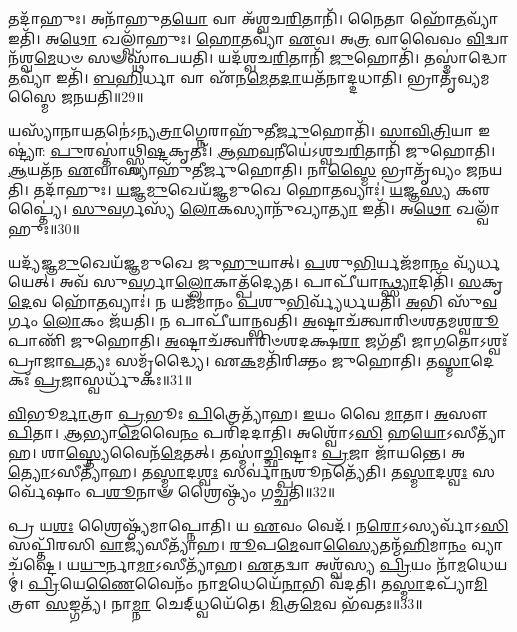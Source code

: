 𑌤𑌦𑌾᳴𑌹𑍁𑌃।
𑌅𑌨𑌾᳴𑌹𑍁𑌤\-\ul{𑌯𑍋} 𑌵𑌾 𑌅᳴𑌶𑍍𑌵𑌚\-\ul{𑌰𑌿}\-𑌤𑌾𑌨𑌿᳴।
𑌨𑍈𑌤𑌾 𑌹𑍋᳴\-\ul{𑌤}\-𑌵𑍍𑌯𑌾᳴ 𑌇𑌤𑌿᳴।
𑌅\-\ul{𑌥𑍋} 𑌖𑌲𑍍𑌵𑌾᳴𑌹𑍁𑌃।
\-\ul{𑌹𑍋}\-\-\ul{𑌤}\-𑌵𑍍𑌯𑌾᳴ \ul{𑌏}\-𑌵।
𑌅\-\ul{𑌤𑍍𑌰} 𑌵𑌾𑌵𑍈𑌵𑌂 \ul{𑌵𑌿}\-𑌦𑍍𑌵𑌾𑌨᳴𑌶𑍍𑌵\-\ul{𑌮𑍇}\-𑌧𑍞 𑌸𑍟𑌸𑍍𑌥𑌾᳴𑌪𑌯𑌤𑌿।
𑌯𑌦᳴𑌶𑍍𑌵𑌚\-\ul{𑌰𑌿}\-𑌤𑌾𑌨𑌿᳴ \ul{𑌜𑍁}\-𑌹𑍋𑌤𑌿᳴।
𑌤𑌸𑍍𑌮𑌾॑𑌦𑍍𑌧𑍋\-\ul{𑌤}\-𑌵𑍍𑌯𑌾᳴ 𑌇𑌤𑌿᳴।
\-\ul{𑌬}\-\-\ul{𑌹𑌿}\-𑌰𑍍𑌧𑌾 𑌵𑌾 𑌏᳴𑌨\-\ul{𑌮𑍇}\-𑌤\-\ul{𑌦𑌾}\-𑌯𑌤᳴𑌨𑌾𑌦𑍍𑌦𑌧𑌾𑌤𑌿।
𑌭𑍍𑌰𑌾𑌤𑍃᳴𑌵𑍍𑌯𑌮𑌸𑍍𑌮𑍈 𑌜𑌨𑌯𑌤𑌿॥29॥

𑌯𑌸𑍍𑌯𑌾᳴𑌨𑌾𑌯\-\ul{𑌤}\-𑌨𑍇॑\-𑌽𑌨𑍍𑌯\-\ul{𑌤𑍍𑌰𑌾}\-𑌗𑍍𑌨𑍇𑌰𑌾𑌹𑍁᳴𑌤𑍀\-\ul{𑌰𑍍𑌜𑍁}\-𑌹𑍋𑌤𑌿᳴।
\-\ul{𑌸𑌾}\-\-\ul{𑌵𑌿}\-\-\ul{𑌤𑍍𑌰𑌿}\-𑌯𑌾 𑌇𑌷𑍍𑌟𑍍𑌯𑌾॑: \ul{𑌪𑍁}\-𑌰𑌸𑍍𑌤𑌾॑𑌥𑍍𑌸𑍍𑌵𑌿\-\ul{𑌷𑍍𑌟}\-𑌕𑍃𑌤𑌃᳴।
\-\ul{𑌆}\-\-\ul{𑌹}\-\-\ul{𑌵}\-𑌨𑍀𑌯𑍇॑\-𑌽𑌶𑍍𑌵𑌚\-\ul{𑌰𑌿}\-𑌤𑌾𑌨𑌿᳴ 𑌜𑍁𑌹𑍋𑌤𑌿।
\-\ul{𑌆}\-𑌯𑌤᳴𑌨 \ul{𑌏}\-𑌵𑌾𑌸𑍍𑌯𑌾𑌹𑍁᳴𑌤𑍀𑌰𑍍𑌜𑍁𑌹𑍋𑌤𑌿।
𑌨𑌾\-\ul{𑌸𑍍𑌮𑍈} 𑌭𑍍𑌰𑌾𑌤𑍃᳴𑌵𑍍𑌯𑌂 𑌜𑌨𑌯𑌤𑌿।
𑌤𑌦𑌾᳴𑌹𑍁𑌃।
\-\ul{𑌯}\-\-\ul{𑌜𑍍𑌞}\-\-\ul{𑌮𑍁}\-𑌖𑍇𑌯᳴𑌜𑍍𑌞𑌮𑍁𑌖𑍇 𑌹𑍋\-\ul{𑌤}\-𑌵𑍍𑌯𑌾𑌃॑।
\-\ul{𑌯}\-𑌜𑍍𑌞\-\ul{𑌸𑍍𑌯} 𑌕𑍢𑌪𑍍𑌤𑍍𑌯𑍈॑।
\-\ul{𑌸𑍁}\-\-\ul{𑌵}\-𑌰𑍍𑌗𑌸𑍍𑌯᳴ \ul{𑌲𑍋}\-𑌕𑌸𑍍𑌯𑌾𑌨𑍁᳴𑌖𑍍𑌯𑌾\-\ul{𑌤𑍍𑌯𑌾} 𑌇𑌤𑌿᳴।
𑌅\-\ul{𑌥𑍋} 𑌖𑌲𑍍𑌵𑌾᳴𑌹𑍁𑌃॥30॥

𑌯𑌦𑍍𑌯᳴𑌜𑍍𑌞\-\ul{𑌮𑍁}\-𑌖𑍇𑌯᳴𑌜𑍍𑌞𑌮𑍁𑌖𑍇 𑌜𑍁\-\ul{𑌹𑍁}\-𑌯𑌾𑌤𑍍।
\-\ul{𑌪}\-𑌶𑍁\-\ul{𑌭𑌿}\-𑌰𑍍𑌯𑌜᳴𑌮𑌾\-\ul{𑌨𑌂} 𑌵𑍍𑌯᳴𑌰𑍍𑌧𑌯𑍇𑌤𑍍।
𑌅𑌵᳴ 𑌸𑍁\-\ul{𑌵}\-𑌰𑍍𑌗𑌾\-\ul{𑌲𑍍𑌲𑍋}\-𑌕𑌾𑌤𑍍𑌪᳴𑌦𑍍𑌯𑍇𑌤।
𑌪𑌾𑌪𑍀᳴𑌯𑌾\-\ul{𑌨𑍍𑌥𑍍𑌸𑍍𑌯𑌾}\-𑌦𑌿𑌤𑌿᳴।
\-\ul{𑌸}\-𑌕𑍃\-\ul{𑌦𑍇}\-𑌵 𑌹𑍋᳴\-\ul{𑌤}\-𑌵𑍍𑌯𑌾𑌃॑।
𑌨 𑌯𑌜᳴𑌮𑌾𑌨𑌂 \ul{𑌪}\-𑌶𑍁\-\ul{𑌭𑌿}\-𑌰𑍍𑌵𑍍𑌯᳴𑌰𑍍𑌧𑌯𑌤𑌿।
\-\ul{𑌅}\-𑌭𑌿 𑌸𑍁᳴\-\ul{𑌵}\-𑌰𑍍𑌗𑌂 \ul{𑌲𑍋}\-𑌕𑌂 𑌜᳴𑌯𑌤𑌿।
𑌨 𑌪𑌾𑌪𑍀᳴𑌯𑌾𑌨𑍍𑌭𑌵𑌤𑌿।
\-\ul{𑌅}\-𑌷𑍍𑌟𑌾𑌚᳴𑌤𑍍𑌵𑌾𑌰𑌿𑍞𑌶𑌤𑌮𑌶𑍍𑌵\-\ul{𑌰𑍂}\-𑌪𑌾𑌣𑌿᳴ 𑌜𑍁𑌹𑍋𑌤𑌿।
\-\ul{𑌅}\-𑌷𑍍𑌟𑌾𑌚᳴𑌤𑍍𑌵𑌾𑌰𑌿𑍞𑌶𑌦𑌕𑍍𑌷\-\ul{𑌰𑌾} 𑌜𑌗᳴𑌤𑍀।
𑌜𑌾\-\ul{𑌗}\-𑌤𑍋\-𑌽𑌶𑍍𑌵𑌃᳴ 𑌪𑍍𑌰𑌾𑌜𑌾\-\ul{𑌪}\-𑌤𑍍𑌯𑌃 𑌸𑌮𑍃᳴𑌦𑍍𑌧𑍍𑌯𑍈।
𑌏\-\ul{𑌕}\-𑌮𑌤𑌿᳴𑌰𑌿𑌕𑍍𑌤𑌂 𑌜𑍁𑌹𑍋𑌤𑌿।
𑌤\-\ul{𑌸𑍍𑌮𑌾}\-𑌦𑍇𑌕𑌃᳴ \ul{𑌪𑍍𑌰}\-𑌜𑌾𑌸𑍍𑌵𑌰𑍍𑌧𑍁᳴𑌕𑌃॥31॥\anuvakamend[\-\ul{𑌅}\-\-\ul{𑌰𑍍𑌧}\-\-\ul{𑌯}\-\-\ul{𑌤𑌿} \ul{𑌜}\-\-\ul{𑌨}\-\-\ul{𑌯}\-\-\ul{𑌤𑌿} 𑌖𑌲𑍍𑌵𑌾᳴\-\ul{𑌹𑍁}\-𑌰𑍍𑌜𑌗᳴\-\ul{𑌤𑍀} 𑌤𑍍𑌰𑍀𑌣𑌿᳴ 𑌚]

\-\ul{𑌵𑌿}\-𑌭𑍂\-\ul{𑌰𑍍𑌮𑌾}\-𑌤𑍍𑌰𑌾 \ul{𑌪𑍍𑌰}\-𑌭𑍂𑌃 \ul{𑌪𑌿}\-𑌤𑍍𑌰𑍇𑌤𑍍𑌯𑌾᳴𑌹।
\-\ul{𑌇}\-𑌯𑌂 𑌵𑍈 \ul{𑌮𑌾}\-𑌤𑌾।
\-\ul{𑌅}\-𑌸𑍗 \ul{𑌪𑌿}\-𑌤𑌾।
\-\ul{𑌆}\-𑌭𑍍𑌯𑌾\-\ul{𑌮𑍇}\-𑌵𑍈\-\ul{𑌨𑌂} 𑌪𑌰𑌿᳴𑌦𑌦𑌾𑌤𑌿।
𑌅𑌶𑍍𑌵𑍋᳴𑌽\-\ul{𑌸𑌿} 𑌹\-\ul{𑌯𑍋}\-\-𑌽𑌸𑍀𑌤𑍍𑌯𑌾᳴𑌹।
𑌶𑌾\-\ul{𑌸𑍍𑌤𑍍𑌯𑍇}\-𑌵𑍈𑌨᳴\-\ul{𑌮𑍇}\-𑌤𑌤𑍍।
𑌤𑌸𑍍𑌮𑌾॑\-\ul{𑌚𑍍𑌛𑌿}\-𑌷𑍍𑌟𑌾𑌃 \ul{𑌪𑍍𑌰}\-𑌜𑌾 𑌜𑌾᳴𑌯𑌨𑍍𑌤𑍇।
𑌅\-\ul{𑌤𑍍𑌯𑍋}\-\-𑌽𑌸𑍀𑌤𑍍𑌯𑌾᳴𑌹।
𑌤\-\ul{𑌸𑍍𑌮𑌾}\-𑌦\-\ul{𑌶𑍍𑌵𑌃} 𑌸𑌰𑍍𑌵𑌾॑\-\ul{𑌨𑍍𑌪}\-𑌶𑍂𑌨𑌤𑍍𑌯𑍇᳴𑌤𑌿।
𑌤\-\ul{𑌸𑍍𑌮𑌾}\-𑌦\-\ul{𑌶𑍍𑌵𑌃} 𑌸𑌰𑍍𑌵𑍇᳴𑌷𑌾𑌂 𑌪\-\ul{𑌶𑍂}\-𑌨𑌾𑍟 𑌶𑍍𑌰𑍈𑌷𑍍𑌠𑍍𑌯𑌂᳴ 𑌗𑌚𑍍𑌛𑌤𑌿॥32॥

𑌪𑍍𑌰 𑌯\-\ul{𑌶𑌃} 𑌶𑍍𑌰𑍈𑌷𑍍𑌠𑍍𑌯᳴𑌮𑌾𑌪𑍍𑌨𑍋𑌤𑌿।
𑌯 \ul{𑌏}\-𑌵𑌂 𑌵𑍇𑌦᳴।
𑌨\-\ul{𑌰𑍋}\-𑌽𑌸𑍍𑌯𑌰𑍍𑌵𑌾᳴𑌽\-\ul{𑌸𑌿} 𑌸𑌪𑍍𑌤𑌿᳴𑌰𑌸𑌿 \ul{𑌵𑌾}\-𑌜𑍍𑌯᳴𑌸𑍀𑌤𑍍𑌯𑌾᳴𑌹।
\-\ul{𑌰𑍂}\-𑌪\-\ul{𑌮𑍇}\-𑌵𑌾\-\ul{𑌸𑍍𑌯𑍈}\-𑌤𑌨𑍍𑌮᳴\-\ul{𑌹𑌿}\-𑌮𑌾\-\ul{𑌨𑌂} 𑌵𑍍𑌯𑌾𑌚᳴𑌷𑍍𑌟𑍇।
𑌯\-\ul{𑌯𑍁}\-𑌰𑍍𑌨𑌾\-\ul{𑌮𑌾}\-\-𑌽𑌸𑍀𑌤𑍍𑌯𑌾᳴𑌹।
\-\ul{𑌏}\-𑌤𑌦𑍍𑌵𑌾 𑌅𑌶𑍍𑌵᳴𑌸𑍍𑌯 \ul{𑌪𑍍𑌰𑌿}\-𑌯𑌂 𑌨𑌾᳴\-\ul{𑌮}\-𑌧𑍇𑌯𑌮𑍍॑।
\-\ul{𑌪𑍍𑌰𑌿}\-𑌯𑍇\-\ul{𑌣𑍈}\-𑌵𑍈𑌨𑌂᳴ 𑌨𑌾\-\ul{𑌮}\-𑌧𑍇𑌯𑍇᳴\-\ul{𑌨𑌾}\-𑌭𑌿 𑌵᳴𑌦𑌤𑌿।
𑌤\-\ul{𑌸𑍍𑌮𑌾}\-𑌦𑌪𑍍𑌯𑌾᳴\-\ul{𑌮𑌿}\-𑌤𑍍𑌰𑍗 \ul{𑌸}\-𑌙𑍍𑌗𑌤𑍍𑌯᳴।
𑌨𑌾\-\ul{𑌮𑍍𑌨𑌾} 𑌚𑍇𑌦𑍍‌𑌧𑍍𑌵𑌯𑍇᳴𑌤𑍇।
\-\ul{𑌮𑌿}\-𑌤𑍍𑌰\-\ul{𑌮𑍇}\-𑌵 𑌭᳴𑌵𑌤𑌃॥33॥

